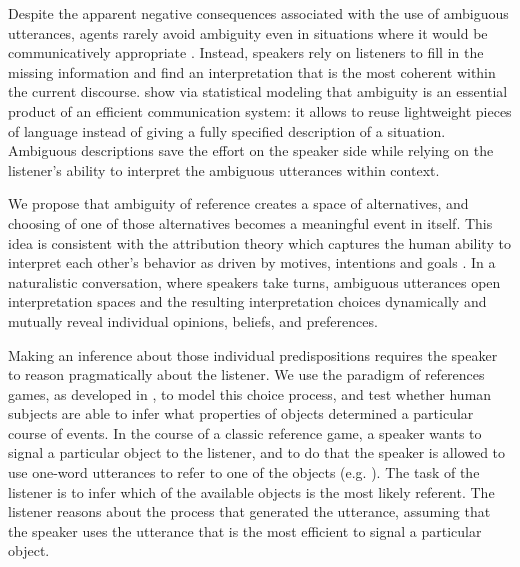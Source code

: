 \documentclass[10pt,a4paper]{article}
\begin{document}
Despite the apparent negative consequences associated with the use of ambiguous utterances, agents rarely avoid ambiguity even in situations where it would be communicatively appropriate \cite{wasow2015, ferreira2008}. Instead, speakers rely on listeners to fill in the missing information and find an interpretation that is the most coherent within the current discourse.   show via statistical modeling that ambiguity is an essential product of an efficient communication system: it allows to reuse lightweight pieces of language instead of giving a fully specified description of a situation. Ambiguous descriptions save the effort on the speaker side while relying on the listener's ability to interpret the ambiguous utterances within context.

We propose that ambiguity of reference creates a space of alternatives, and choosing of one of those alternatives becomes a meaningful event in itself. This idea is consistent with the attribution theory which captures the human ability to interpret each other's behavior as driven by motives, intentions and goals \cite{jones1965acts, kelley1967attribution, kelley1970social}.
 In a naturalistic conversation, where speakers take turns, ambiguous utterances open interpretation spaces and the resulting interpretation choices dynamically and mutually reveal individual opinions, beliefs, and preferences. 
 
 Making an inference about those individual predispositions requires the speaker to reason pragmatically about the listener.
We use the paradigm of references games, as developed in , to model this choice process, and test whether human subjects are able to infer what properties of objects determined a particular course of events. In the course of a classic reference game, a speaker wants to signal a particular object to the listener, and to do that the speaker is allowed to use one-word utterances to refer to one of the objects (e.g. ). The task of the listener is to infer which of the available objects is the most likely referent. The listener reasons about the process that generated the utterance, assuming that the speaker uses the utterance that is the most efficient to signal a particular object. 
\end{document}
